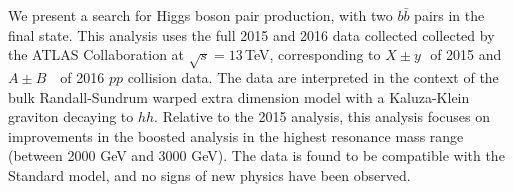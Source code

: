 
We present a search for Higgs boson pair production, with two $b\bar{b}$ pairs in the final state. This analysis uses the full 2015 and 2016 data collected collected by the ATLAS Collaboration at $\sqrt{s}=13$\,TeV, corresponding to $X \pm y$\,\ifb\ of 2015 and $A \pm B$\, \ifb\ of 2016 $pp$ collision data. The data are interpreted in the context of the bulk Randall-Sundrum warped extra dimension model with a Kaluza-Klein graviton 
decaying to $hh$.%
Relative to the 2015 analysis, this analysis focuses on improvements in the boosted analysis in the highest resonance mass range (between 2000 GeV and 3000 GeV). The data is found to be compatible with the Standard model, and no signs of new physics have been observed.   